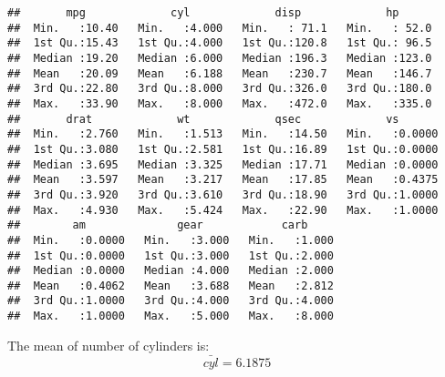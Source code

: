 \documentclass[]{article}
\newenvironment{Shaded}{\begin{snugshade}}{\end{snugshade}}
\newcommand{\KeywordTok}[1]{\textcolor[rgb]{0.13,0.29,0.53}{\textbf{#1}}}
\newcommand{\NormalTok}[1]{#1}
\newcommand{\OperatorTok}[1]{\textcolor[rgb]{0.81,0.36,0.00}{\textbf{#1}}}
\newcommand{\StringTok}[1]{\textcolor[rgb]{0.31,0.60,0.02}{#1}}
\begin{document}
\begin{verbatim}
##       mpg             cyl             disp             hp       
##  Min.   :10.40   Min.   :4.000   Min.   : 71.1   Min.   : 52.0  
##  1st Qu.:15.43   1st Qu.:4.000   1st Qu.:120.8   1st Qu.: 96.5  
##  Median :19.20   Median :6.000   Median :196.3   Median :123.0  
##  Mean   :20.09   Mean   :6.188   Mean   :230.7   Mean   :146.7  
##  3rd Qu.:22.80   3rd Qu.:8.000   3rd Qu.:326.0   3rd Qu.:180.0  
##  Max.   :33.90   Max.   :8.000   Max.   :472.0   Max.   :335.0  
##       drat             wt             qsec             vs        
##  Min.   :2.760   Min.   :1.513   Min.   :14.50   Min.   :0.0000  
##  1st Qu.:3.080   1st Qu.:2.581   1st Qu.:16.89   1st Qu.:0.0000  
##  Median :3.695   Median :3.325   Median :17.71   Median :0.0000  
##  Mean   :3.597   Mean   :3.217   Mean   :17.85   Mean   :0.4375  
##  3rd Qu.:3.920   3rd Qu.:3.610   3rd Qu.:18.90   3rd Qu.:1.0000  
##  Max.   :4.930   Max.   :5.424   Max.   :22.90   Max.   :1.0000  
##        am              gear            carb      
##  Min.   :0.0000   Min.   :3.000   Min.   :1.000  
##  1st Qu.:0.0000   1st Qu.:3.000   1st Qu.:2.000  
##  Median :0.0000   Median :4.000   Median :2.000  
##  Mean   :0.4062   Mean   :3.688   Mean   :2.812  
##  3rd Qu.:1.0000   3rd Qu.:4.000   3rd Qu.:4.000  
##  Max.   :1.0000   Max.   :5.000   Max.   :8.000
\end{verbatim}

\begin{Shaded}
\end{Shaded}

The mean of number of cylinders is: \[ \bar{cyl} = 6.1875\]
\end{document}
